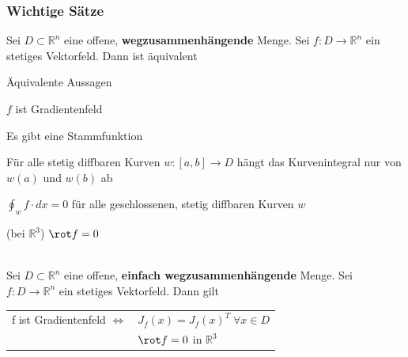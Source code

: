 \begin{sectionbox}
    \subsubsection{Wichtige Sätze}
    Sei $D\subset \mathbb R^n$ eine offene, \textbf{wegzusammenhängende} Menge.
    Sei $f: D\rightarrow \mathbb R^n$ ein stetiges Vektorfeld.
    Dann ist äquivalent
    \begin{cookbox}{Äquivalente Aussagen}
        \item $f$ ist Gradientenfeld
        \item Es gibt eine Stammfunktion
        \item Für alle stetig diffbaren Kurven $w: [a,b] \rightarrow D$ hängt das Kurvenintegral nur von $w(a)$ und $w(b)$ ab
        \item $\oint_w f \cdot dx=0$ für alle geschlossenen, stetig diffbaren Kurven $w$
        \item (bei $\mathbb R^3$) $\rot f=0$
    \end{cookbox}

    \noindent\makebox[\linewidth]{\rule{\columnwidth}{0.4pt}} \\

    Sei $D \subset \mathbb R^n$ eine offene, \textbf{einfach wegzusammenhängende} Menge.
    Sei $f: D\rightarrow \mathbb R^n$ ein stetiges Vektorfeld.
    Dann gilt
    \begin{emphbox}
        \setlength{\tabcolsep}{0.1em}
        \begin{tabular}{cl}
            f ist Gradientenfeld $\Longleftrightarrow$ & $J_f(x)=J_f(x)^T \; \forall x \in D$ \\
                                                       & $\rot f=0$ in $\mathbb R^3$
        \end{tabular}
    \end{emphbox}

\end{sectionbox}
